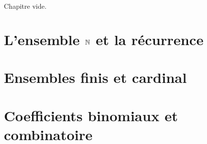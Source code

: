 Chapitre vide.

\section{L'ensemble $\mathbb{N}$ et la récurrence}

\section{Ensembles finis et cardinal}

\section{Coefficients binomiaux et combinatoire}
